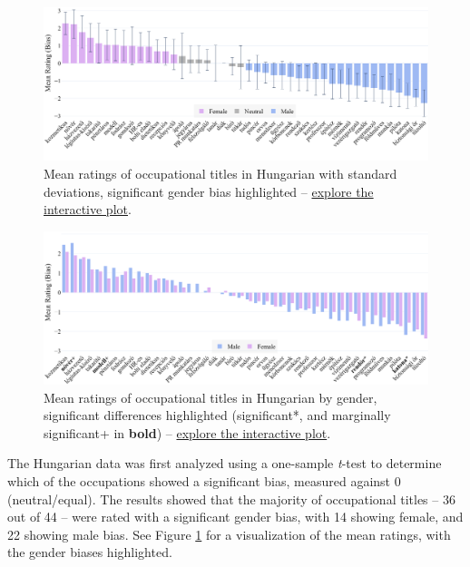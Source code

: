 \documentclass[11pt]{article}
\begin{document}
\begin{figure}[!ht]
  \centering
  \includegraphics[width=\linewidth]{../occupations_hu}
  \caption{Mean ratings of occupational titles in Hungarian with standard deviations, significant gender bias highlighted -- \href{https://htmlpreview.github.io/?https://github.com/partigabor/occupational-bias/blob/main/occupations_hu.html}{explore the interactive plot}.}
  \label{fig:occupations_hu}
\end{figure}

\begin{figure}[tbp]
  \centering
  \includegraphics[width=\linewidth]{../occupations_hu_gender}
  \caption{Mean ratings of occupational titles in Hungarian by gender, significant differences highlighted (significant*, and marginally significant+ in \textbf{bold}) -- \href{https://htmlpreview.github.io/?https://github.com/partigabor/occupational-bias/blob/main/occupations_hu_gender.html}{explore the interactive plot}.}
  \label{fig:occupations_hu_gender}
\end{figure}


The Hungarian data was first analyzed using a one-sample \textit{t}-test to determine which of the occupations showed a significant bias, measured against 0 (neutral/equal). The results showed that the majority of occupational titles -- 36 out of 44 -- were rated with a significant gender bias, with 14 showing female, and 22 showing male bias. See Figure \ref{fig:occupations_hu} for a visualization of the mean ratings, with the gender biases highlighted.
\end{document}
